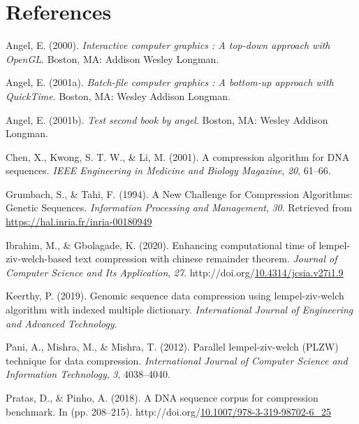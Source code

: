 \documentclass[12pt,twoside]{reedthesis}
\newlength{\cslhangindent}
\newenvironment{CSLReferences}[2] %
 {%
  \setlength{\parindent}{0pt}
  \ifodd #1 \everypar{\setlength{\hangindent}{\cslhangindent}}\ignorespaces\fi
  \ifnum #2 > 0
  \setlength{\parskip}{#2\baselineskip}
  \fi
 }%
 {}
\begin{document}
\backmatter

\hypertarget{references}{%
\chapter*{References}\label{references}}


\noindent

\setlength{\parindent}{-0.20in}

\hypertarget{refs}{}
\begin{CSLReferences}{1}{0}
\leavevmode{}%
Angel, E. (2000). \emph{Interactive computer graphics : A top-down approach with OpenGL}. Boston, MA: Addison Wesley Longman.

\leavevmode{}%
Angel, E. (2001a). \emph{Batch-file computer graphics : A bottom-up approach with QuickTime}. Boston, MA: Wesley Addison Longman.

\leavevmode{}%
Angel, E. (2001b). \emph{Test second book by angel}. Boston, MA: Wesley Addison Longman.

\leavevmode{}%
Chen, X., Kwong, S. T. W., \& Li, M. (2001). A compression algorithm for DNA sequences. \emph{IEEE Engineering in Medicine and Biology Magazine}, \emph{20}, 61--66.

\leavevmode{}%
Grumbach, S., \& Tahi, F. (1994). {A New Challenge for Compression Algorithms: Genetic Sequences}. \emph{{Information Processing and Management}}, \emph{30}. Retrieved from \url{https://hal.inria.fr/inria-00180949}

\leavevmode{}%
Ibrahim, M., \& Gbolagade, K. (2020). Enhancing computational time of lempel-ziv-welch-based text compression with chinese remainder theorem. \emph{Journal of Computer Science and Its Application}, \emph{27}. http://doi.org/\href{https://doi.org/10.4314/jcsia.v27i1.9}{10.4314/jcsia.v27i1.9}

\leavevmode{}%
Keerthy, P. (2019). Genomic sequence data compression using lempel-ziv-welch algorithm with indexed multiple dictionary. \emph{International Journal of Engineering and Advanced Technology}.

\leavevmode{}%
Pani, A., Mishra, M., \& Mishra, T. (2012). Parallel lempel-ziv-welch (PLZW) technique for data compression. \emph{International Journal of Computer Science and Information Technology}, \emph{3}, 4038--4040.

\leavevmode{}%
Pratas, D., \& Pinho, A. (2018). A DNA sequence corpus for compression benchmark. In (pp. 208--215). http://doi.org/\href{https://doi.org/10.1007/978-3-319-98702-6_25}{10.1007/978-3-319-98702-6\_25}

\end{CSLReferences}

\end{document}
